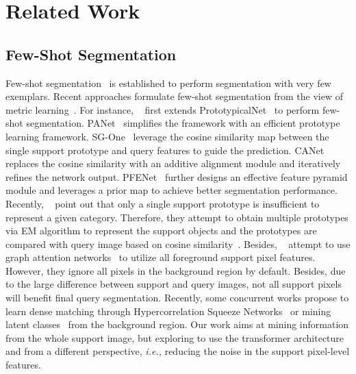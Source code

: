 \documentclass{article}
\begin{document}
 

\section{Related Work}
\label{sec:related}
\subsection{Few-Shot Segmentation}
Few-shot segmentation~\cite{shaban2017oslsm} is established to perform segmentation with very few exemplars. Recent approaches formulate few-shot segmentation from the view of metric learning~\cite{sung2018relationnet,dong2018FSSPL,wang2019panet}. For instance, ~\cite{dong2018FSSPL} first extends PrototypicalNet~\cite{snell2017prototypical} to perform few-shot segmentation. PANet~\cite{wang2019panet} simplifies the framework with an efficient prototype learning framework. SG-One~\cite{zhang2020sgone} leverage the cosine similarity map between the single support prototype and query features to guide the prediction. CANet~\cite{zhang2019canet} replaces the cosine similarity with an additive alignment module and iteratively refines the network output. PFENet~\cite{tian2020pfenet} further designs an effective feature pyramid module and leverages a prior map to achieve better segmentation performance. 
Recently, ~\cite{yang2020PMM,liu2020ppnet,zhang2019pgnet} point out that only a single support prototype is insufficient to represent a given category. Therefore, they attempt to obtain multiple prototypes via EM algorithm to represent the support objects and the prototypes are compared with query image based on cosine similarity~\cite{liu2020ppnet,yang2020PMM}. Besides, ~\cite{zhang2019pgnet,cao2020dan} attempt to use graph attention networks~\cite{velivckovic2017gat,wu2020bidirectional} to utilize all foreground support pixel features. However, they ignore all pixels in the background region by default. Besides, due to the large difference between support and query images, not all support pixels will benefit final query segmentation. Recently, some concurrent works propose to learn dense matching through Hypercorrelation Squeeze Networks~\cite{min2021hypercorrelation} or mining latent classes~\cite{yang2021mining} from the background region. Our work aims at mining information from the whole support image, but exploring to use the transformer architecture and from a different perspective, \textit{i.e.,} reducing the noise in the support pixel-level features. 
\end{document}
